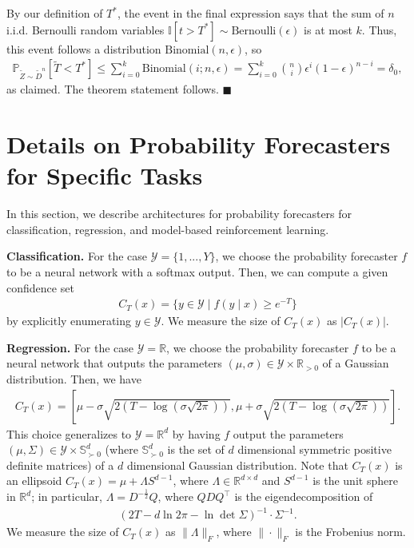 \documentclass{article} \usepackage{iclr2020_conference,times}
\renewcommand{\(}						{\left(}
\renewcommand{\)}						{\right)}
\renewcommand{\[}						{\left[}
\renewcommand{\]}						{\right]}
\newcommand{\<}						{\left<}
\renewcommand{\>}						{\right>}
\begin{document}
By our definition of $T^*$, the event in the final expression says that the sum of $n$ i.i.d. Bernoulli random variables $\mathbb{I}[t > T^*]\sim\text{Bernoulli}(\epsilon)$ is at most $k$. Thus, this event follows a distribution $\text{Binomial}(n,\epsilon)$, so
\begin{align*}
\mathbb{P}_{\tilde{Z}\sim\tilde{D}^n}\left[\tilde{T}<T^*\right]
\le\sum_{i=0}^k\text{Binomial}(i;n,\epsilon)=\sum_{i=0}^k{n\choose i}\epsilon^i(1-\epsilon)^{n-i}
=\delta_0,
\end{align*}
as claimed. The theorem statement follows. $\blacksquare$

\section{Details on Probability Forecasters for Specific Tasks}
\label{sec:appendixforecasters}

In this section, we describe architectures for probability forecasters for classification, regression, and model-based reinforcement learning.

\textbf{Classification.}
For the case $\mathcal{Y}=\{1,...,Y\}$, we choose the probability forecaster $f$ to be a neural network with a softmax output. Then, we can compute a given confidence set
\begin{align*}
C_T(x)=\{y\in\mathcal{Y}\mid f(y\mid x)\ge e^{-T}\}
\end{align*}
by explicitly enumerating $y\in\mathcal{Y}$. We measure the size of $C_T(x)$ as $|C_T(x)|$.

\textbf{Regression.}
For the case $\mathcal{Y}=\mathbb{R}$, we choose the probability forecaster $f$ to be a neural network that outputs the parameters $(\mu,\sigma)\in\mathcal{Y}\times\mathbb{R}_{>0}$ of a Gaussian distribution. Then, we have
\begin{align*}
C_T(x)=\left[\mu-\sigma\sqrt{2( T-\log(\sigma\sqrt{2\pi}))},\mu+\sigma\sqrt{2( T-\log(\sigma\sqrt{2\pi}))}\right].
\end{align*}
This choice generalizes to $\mathcal{Y}=\mathbb{R}^d$ by having $f$ output the parameters $(\mu,\Sigma)\in\mathcal{Y}\times\mathbb{S}_{\succ0}^d$ (where $\mathbb{S}_{\succ0}^d$ is the set of $d$ dimensional symmetric positive definite matrices) of a $d$ dimensional Gaussian distribution. Note that $C_T(x)$ is an ellipsoid $C_T(x)=\mu+\Lambda S^{d-1}$, where $\Lambda\in\mathbb{R}^{d\times d}$ and $S^{d-1}$ is the unit sphere in $\mathbb{R}^d$; in particular, $\Lambda = D^{-\frac{1}{2}} Q$, where $QDQ^{\top}$ is the eigendecomposition of
\begin{align*}
(2T - d \ln 2 \pi - \ln \det \Sigma)^{-1}\cdot\Sigma^{-1}.
\end{align*}
We measure the size of $C_T(x)$ as $\|\Lambda\|_F$, where $\|\cdot\|_F$ is the Frobenius norm.
\end{document}

